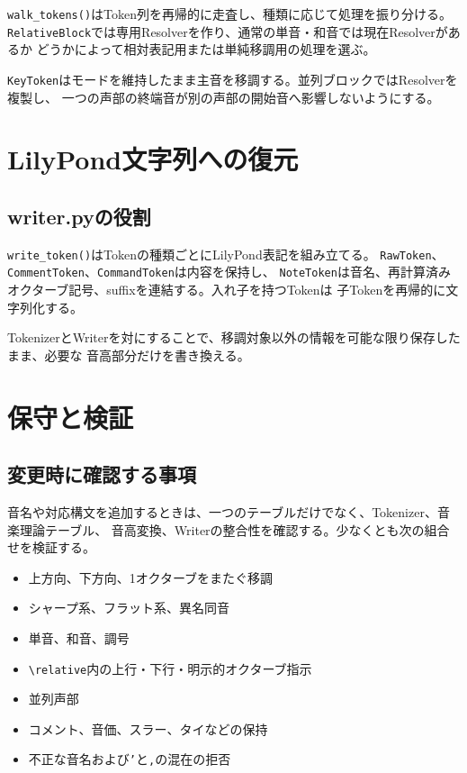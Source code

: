 \documentclass[uplatex,a4paper,11pt]{jsbook}
\begin{document}
\texttt{walk\_tokens()}はToken列を再帰的に走査し、種類に応じて処理を振り分ける。
\texttt{RelativeBlock}では専用Resolverを作り、通常の単音・和音では現在Resolverがあるか
どうかによって相対表記用または単純移調用の処理を選ぶ。

\texttt{KeyToken}はモードを維持したまま主音を移調する。並列ブロックではResolverを複製し、
一つの声部の終端音が別の声部の開始音へ影響しないようにする。



\chapter{LilyPond文字列への復元}

\section{writer.pyの役割}

\texttt{write\_token()}はTokenの種類ごとにLilyPond表記を組み立てる。
\texttt{RawToken}、\texttt{CommentToken}、\texttt{CommandToken}は内容を保持し、
\texttt{NoteToken}は音名、再計算済みオクターブ記号、suffixを連結する。入れ子を持つTokenは
子Tokenを再帰的に文字列化する。

TokenizerとWriterを対にすることで、移調対象以外の情報を可能な限り保存したまま、必要な
音高部分だけを書き換える。



\chapter{保守と検証}

\section{変更時に確認する事項}

音名や対応構文を追加するときは、一つのテーブルだけでなく、Tokenizer、音楽理論テーブル、
音高変換、Writerの整合性を確認する。少なくとも次の組合せを検証する。

\begin{itemize}
  \item 上方向、下方向、1オクターブをまたぐ移調
  \item シャープ系、フラット系、異名同音
  \item 単音、和音、調号
  \item \texttt{\textbackslash relative}内の上行・下行・明示的オクターブ指示
  \item 並列声部
  \item コメント、音価、スラー、タイなどの保持
  \item 不正な音名および\texttt{'}と\texttt{,}の混在の拒否
\end{itemize}
\end{document}
